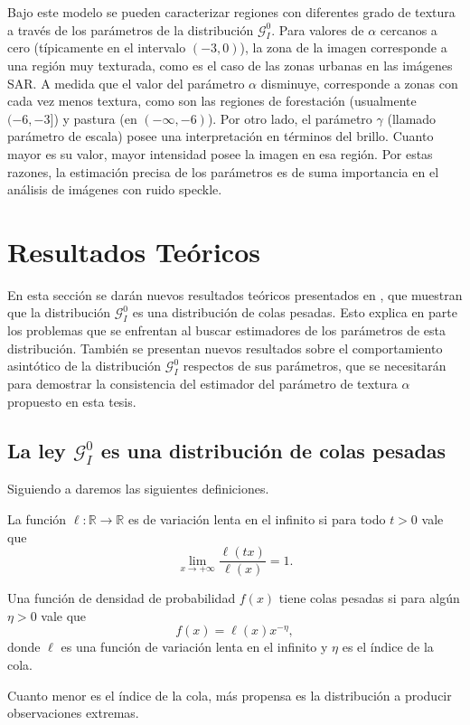 Bajo este modelo se pueden caracterizar regiones con diferentes grado de textura a través de los parámetros de la distribución $\mathcal{G}_I^{0}$. Para valores de $\alpha$ cercanos a cero (típicamente en el intervalo $(-3,0)$), la zona de la imagen corresponde a una región muy texturada, como es el caso de las zonas urbanas en las imágenes SAR. A medida que el valor del parámetro $\alpha$ disminuye, corresponde a zonas con cada vez menos textura, como son las regiones de forestación (usualmente $(-6,-3]$) y pastura (en $(-\infty,-6)$). Por otro lado, el parámetro $\gamma$ (llamado parámetro de escala) posee una interpretación en términos del brillo. Cuanto mayor es su valor, mayor intensidad posee la imagen en esa región. Por estas razones, la estimación precisa de los parámetros es de suma importancia en el análisis de imágenes con ruido speckle. 



\section{Resultados Teóricos}
\label{ResultadosTeoricosGI0}

En esta sección se darán nuevos resultados teóricos presentados en \citet{gambini2015}, que muestran que la distribución $\mathcal{G}_I^0$ es una distribución de colas pesadas. Esto explica en parte los problemas que se enfrentan al buscar estimadores de los parámetros de esta distribución.  También se presentan nuevos resultados sobre el comportamiento asintótico de la distribución $\mathcal{G}_I^0$ respectos de sus parámetros, que se necesitarán para demostrar la consistencia del estimador del parámetro de textura $\alpha$ propuesto en esta tesis.

\subsection{La ley $\mathcal{G}_I^0$ es una distribución de colas pesadas}
\label{colas}
Siguiendo a \citet{Gre,Jorgensen,Rojo} daremos las siguientes definiciones.

\begin{definition} \label{Def:lenta}
	La función $\ell\colon\mathbb R \to\mathbb R$ es de variación lenta en el infinito si para todo $t>0$ vale que
	$$
	\lim_{x\to+\infty}\dfrac{\ell (tx)}{\ell(x)}=1.
	$$
\end{definition}

\begin{definition} 
	Una función de densidad de probabilidad $f(x)$ tiene colas pesadas si para algún $\eta >0$ vale que
	$$
	f(x)=\ell(x)  x^{-\eta},
	$$
	donde $\ell$ es una función de variación lenta en el infinito y $\eta$ es el índice de la cola.
\end{definition}
Cuanto menor es el índice de la cola, más propensa es la distribución a producir observaciones extremas.

